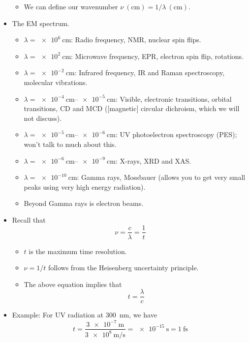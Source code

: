 \documentclass[../notes.tex]{subfiles}
\begin{document}
\begin{itemize}
\begin{itemize}
        \item We can define our wavenumber $\nu\ (\si{\centi\meter})=1/\lambda\ (\si{\centi\meter})$.
    \end{itemize}
    \item The EM spectrum.
    \begin{itemize}
        \item $\lambda=\SI{e6}{\centi\meter}$: Radio frequency, NMR, nuclear spin flips.
        \item $\lambda=\SI{e2}{\centi\meter}$: Microwave frequency, EPR, electron spin flip, rotations.
        \item $\lambda=\SI{e-2}{\centi\meter}$: Infrared frequency, IR and Raman spectroscopy, molecular vibrations.
        \item $\lambda=\SIrange{e-4}{e-5}{\centi\meter}$: Visible, electronic transitions, orbital transitions, CD and MCD ([magnetic] circular dichroism, which we will not discuss).
        \item $\lambda=\SIrange{e-5}{e-6}{\centi\meter}$: UV photoelectron spectroscopy (PES); won't talk to much about this.
        \item $\lambda=\SIrange{e-6}{e-9}{\centi\meter}$: X-rays, XRD and XAS.
        \item $\lambda=\SI{e-10}{\centi\meter}$: Gamma rays, Mossbauer (allows you to get very small peaks using very high energy radiation).
        \item Beyond Gamma rays is electron beams.
    \end{itemize}
    \item Recall that
    \begin{equation*}
        \nu = \frac{c}{\lambda} = \frac{1}{t}
    \end{equation*}
    \begin{itemize}
        \item $t$ is the maximum time resolution.
        \item $\nu=1/t$ follows from the Heisenberg uncertainty principle.
        \item The above equation implies that
        \begin{equation*}
            t = \frac{\lambda}{c}
        \end{equation*}
    \end{itemize}
    \item Example: For UV radiation at \SI{300}{\nano\meter}, we have
    \begin{equation*}
        t = \frac{\SI{3e-7}{\meter}}{\SI{3e8}{\meter\per\second}} = \SI{e-15}{\second} = \SI{1}{\femto\second}

\end{equation*}
\end{itemize}
\end{document}
